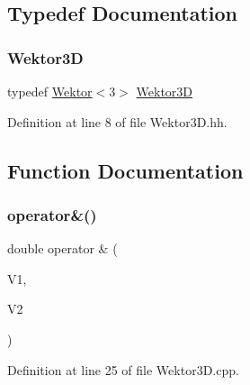 \subsection{Typedef Documentation}
\mbox{\label{_wektor3_d_8hh_ac353a272b38b4ad342f7181ad7bdb91a}} 
\subsubsection{\texorpdfstring{Wektor3D}{Wektor3D}}
{\footnotesize\ttfamily typedef \hyperlink{class_wektor}{Wektor}$<$3$>$ \hyperlink{_wektor3_d_8hh_ac353a272b38b4ad342f7181ad7bdb91a}{Wektor3D}}



Definition at line 8 of file Wektor3\+D.\+hh.



\subsection{Function Documentation}
\mbox{\label{_wektor3_d_8hh_ac3cbaa36ffda58b46bbaa95b99fde093}} 
\subsubsection{\texorpdfstring{operator\&()}{operator\&()}}
{\footnotesize\ttfamily double operator \& (\begin{DoxyParamCaption}\item[{\hyperlink{_wektor3_d_8hh_ac353a272b38b4ad342f7181ad7bdb91a}{Wektor3D}}]{V1,  }\item[{\hyperlink{_wektor3_d_8hh_ac353a272b38b4ad342f7181ad7bdb91a}{Wektor3D}}]{V2 }\end{DoxyParamCaption})}



Definition at line 25 of file Wektor3\+D.\+cpp.

\mbox{\label{_wektor3_d_8hh_a5441b11ac93c93e38a11a796d1855fe3}} 
